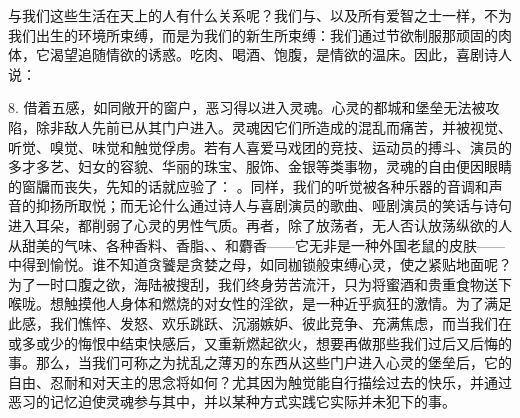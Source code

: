 与我们这些生活在天上的人有什么关系呢？我们与、以及所有爱智之士一样，不为我们出生的环境所束缚，而是为我们的新生所束缚：我们通过节欲制服那顽固的肉体，它渴望追随情欲的诱惑。吃肉、喝酒、饱腹，是情欲的温床。因此，喜剧诗人说：\par

8. 借着五感，如同敞开的窗户，恶习得以进入灵魂。心灵的都城和堡垒无法被攻陷，除非敌人先前已从其门户进入。灵魂因它们所造成的混乱而痛苦，并被视觉、听觉、嗅觉、味觉和触觉俘虏。若有人喜爱马戏团的竞技、运动员的搏斗、演员的多才多艺、妇女的容貌、华丽的珠宝、服饰、金银等类事物，灵魂的自由便因眼睛的窗牖而丧失，先知的话就应验了： 。同样，我们的听觉被各种乐器的音调和声音的抑扬所取悦；而无论什么通过诗人与喜剧演员的歌曲、哑剧演员的笑话与诗句进入耳朵，都削弱了心灵的男性气质。再者，除了放荡者，无人否认放荡纵欲的人从甜美的气味、各种香料、香脂、、和麝香——它无非是一种外国老鼠的皮肤——中得到愉悦。谁不知道贪饕是贪婪之母，如同枷锁般束缚心灵，使之紧贴地面呢？为了一时口腹之欲，海陆被搜刮，我们终身劳苦流汗，只为将蜜酒和贵重食物送下喉咙。想触摸他人身体和燃烧的对女性的淫欲，是一种近乎疯狂的激情。为了满足此感，我们憔悴、发怒、欢乐跳跃、沉溺嫉妒、彼此竞争、充满焦虑，而当我们在或多或少的悔恨中结束快感后，又重新燃起欲火，想要再做那些我们过后又后悔的事。那么，当我们可称之为扰乱之薄刃的东西从这些门户进入心灵的堡垒后，它的自由、忍耐和对天主的思念将如何？尤其因为触觉能自行描绘过去的快乐，并通过恶习的记忆迫使灵魂参与其中，并以某种方式实践它实际并未犯下的事。\par

